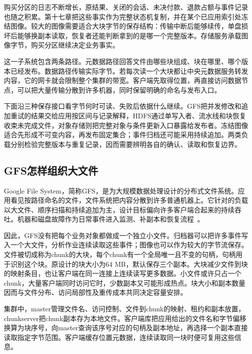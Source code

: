 购买分区的日志不断增长，原结果、关闭的会话、未决付款、退款占额与事件记录也随之积累。第十七章把这些事实作为完整状态机复制，并在某个已应用索引处冻结图像。较大的图像需要适合大块字节的保存结构：传输中断后能够续传，单盘损坏后能够换副本读取，恢复者还能判断拿到的是哪一个完整版本。存储服务承载图像字节，购买分区继续决定业务事实。

这一子系统包含两条路径。元数据路径回答文件由哪些块组成、块在哪里、哪个版本已经发布。数据路径传输实际字节。若每次读一个大块都让中央元数据服务转发内容，它的网卡就会限制整个集群的带宽。客户端先取得位置，再直接访问数据节点，可以把大量传输分散到许多机器，同时保留明确的命名与发布入口。

下面沿三种保存接口看字节何时可读、失败后依据什么继续。GFS把并发修改和追加重试的结果交给应用按区间与记录解释，HDFS通过单写入者、流水线和块恢复收束未完成文件，对象存储则把完整对象与条件更新入口暴露给发布者。冻结图像适合先形成不可变内容，再发布固定集合；事件归档还可能采用持续追加。两类负载分别检验完整版本与重复记录，因而需要辨明各自的确认、读取和恢复边界。


\subsection{GFS怎样组织大文件}

Google File System，简称GFS，是为大规模数据处理设计的分布式文件系统。应用看见按路径命名的文件，文件系统把内容分散到许多普通机器上。它针对的负载以大文件、顺序扫描和持续追加为主，设计目标偏向许多客户端合起来的持续吞吐。机器和磁盘故障作为日常事件进入监测、补副本和恢复流程~\cite{gfs2003}。

因此，GFS没有把每个业务对象都做成一个独立小文件。归档器可以把许多事件写入一个大文件，分析作业连续读取这些事件；图像也可以作为较大的字节流保存。文件被切成称为chunk的大块，每个chunk有一个全局唯一且不变的句柄，句柄用于识别这个块。原设计的块大小为64 MB，默认保存三个副本。大块减少文件到块的映射条目，也让客户端在同一连接上连续读写更多数据。小文件或许只占一个chunk，大量客户端同时访问它时，少数副本又可能形成热点。块大小和副本数量因而与文件分布、访问局部性及重传成本共同决定容量安排。

集群中，master管理文件名、访问控制、文件到chunk的映射、租约和副本放置，chunkserver把chunk副本存为本地文件。客户端库把应用给出的文件名和字节偏移换算为块序号，向master查询该序号对应的句柄及副本地址，再选择一个副本直接读取指定字节范围。客户端缓存位置元数据，连续读取同一块时便可复用这些信息。

